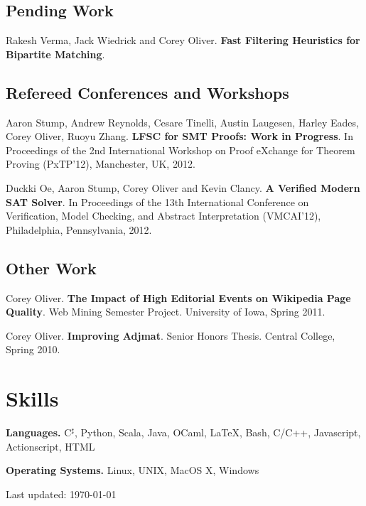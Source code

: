 \documentclass[10pt,letterpaper]{article}
\renewenvironment{itemize}{
  \begin{list}{}{
      \setlength{\leftmargin}{1.5em}
      \setlength{\itemsep}{0.25em}
      \setlength{\parskip}{0pt}
      \setlength{\parsep}{0.25em}
    }
  }{
  \end{list}
}
\begin{document}
\subsection*{Pending Work}

\begin{itemize}
{\item Rakesh Verma, Jack Wiedrick and Corey Oliver. \textbf{Fast
    Filtering Heuristics for Bipartite Matching}.}
\end{itemize}

\subsection*{Refereed Conferences and Workshops}

\begin{itemize}
  {\item Aaron Stump, Andrew Reynolds, Cesare Tinelli, Austin Laugesen, 
    Harley Eades, Corey Oliver, Ruoyu Zhang. \textbf{LFSC for SMT Proofs: 
    Work in Progress}. In Proceedings of the 2nd International Workshop 
    on Proof eXchange for Theorem Proving (PxTP'12), Manchester, UK, 2012.}
\end{itemize}

\begin{itemize}
  {\item Duckki Oe, Aaron Stump, Corey Oliver and Kevin
    Clancy. \textbf{A Verified Modern SAT Solver}. In Proceedings of
    the 13th International Conference on Verification, Model Checking,
    and Abstract Interpretation (VMCAI'12), Philadelphia,
    Pennsylvania, 2012.}
\end{itemize}

\subsection*{Other Work}
\begin{itemize}
\item Corey Oliver. \textbf{The Impact of High Editorial Events on
    Wikipedia Page Quality}. Web Mining Semester Project. University
  of Iowa, Spring 2011.
\item Corey Oliver. \textbf{Improving Adjmat}. Senior Honors
  Thesis. Central College, Spring 2010.
\end{itemize}

\section*{Skills}
\begin{itemize}
\item \textbf{Languages.} C$^\sharp$, Python, Scala, Java, OCaml, \LaTeX, Bash,
  C/C++, Javascript, Actionscript, HTML
\item \textbf{Operating Systems.} Linux, UNIX, MacOS X, Windows
\item
\end{itemize}
\medskip

\begin{center}
  \begin{small}
    Last updated: \today
  \end{small}
\end{center}
\end{document}
